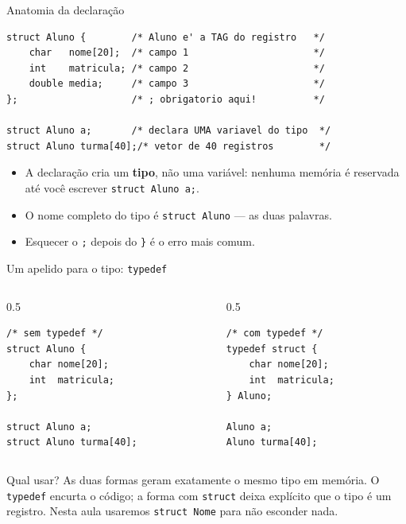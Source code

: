 \documentclass[aspectratio=169]{beamer}
\begin{document}
\begin{frame}[fragile]{Anatomia da declaração}
\begin{lstlisting}[basicstyle=\ttfamily\small]
struct Aluno {        /* Aluno e' a TAG do registro   */
    char   nome[20];  /* campo 1                      */
    int    matricula; /* campo 2                      */
    double media;     /* campo 3                      */
};                    /* ; obrigatorio aqui!          */

struct Aluno a;       /* declara UMA variavel do tipo  */
struct Aluno turma[40];/* vetor de 40 registros        */
\end{lstlisting}
  \begin{itemize}
    \item A declaração cria um \textbf{tipo}, não uma variável: nenhuma memória
      é reservada até você escrever \texttt{struct Aluno a;}.
    \item O nome completo do tipo é \texttt{struct Aluno} --- as duas palavras.
    \item Esquecer o \texttt{;} depois do \texttt{\}} é o erro mais comum.
  \end{itemize}
\end{frame}

\begin{frame}[fragile]{Um apelido para o tipo: \texttt{typedef}}
\begin{columns}[T]
\begin{column}{0.5\textwidth}
\begin{lstlisting}[basicstyle=\ttfamily\scriptsize]
/* sem typedef */
struct Aluno {
    char nome[20];
    int  matricula;
};

struct Aluno a;
struct Aluno turma[40];
\end{lstlisting}
\end{column}
\begin{column}{0.5\textwidth}
\begin{lstlisting}[basicstyle=\ttfamily\scriptsize]
/* com typedef */
typedef struct {
    char nome[20];
    int  matricula;
} Aluno;

Aluno a;
Aluno turma[40];
\end{lstlisting}
\end{column}
\end{columns}
  \begin{block}{Qual usar?}
    As duas formas geram exatamente o mesmo tipo em memória. O \texttt{typedef}
    encurta o código; a forma com \texttt{struct} deixa explícito que o tipo é
    um registro. Nesta aula usaremos \texttt{struct Nome} para não esconder nada.
  \end{block}
\end{frame}
\end{document}
